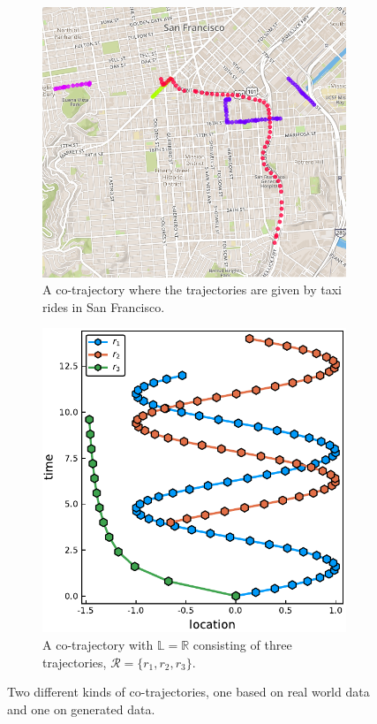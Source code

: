 \documentclass[12pt]{article}
\newcommand{\R}{\mathbb{R}}
\newcommand{\traj}{r}
\newcommand{\cotraj}{\mathcal{R}}
\newcommand{\locset}{\mathbb{L}}
\theoremstyle{definition}
\begin{document}
\begin{figure}
  \centering
  \begin{subfigure}[t]{0.49\textwidth}
    \includegraphics[width=\textwidth]{figures/cotrajectory-taxi.png}
    \caption{A co-trajectory where the trajectories are given by taxi
      rides in San Francisco.}
    \label{fig:co-trajectory-taxi}
  \end{subfigure}
  \begin{subfigure}[t]{0.49\textwidth}
    \includegraphics[width=\textwidth]{figures/cotrajectory_tempospatial.pdf}
    \caption{A co-trajectory with \(\locset = \R\) consisting of three
      trajectories, \(\cotraj = \{\traj_{1}, \traj_{2}, \traj_{3}\}\).}
    \label{fig:co-trajectory-tempospatial}
  \end{subfigure}
  \caption{Two different kinds of co-trajectories, one based on real
    world data and one on generated data.}
  \label{fig:co-trajectory}
\end{figure}
\end{document}
